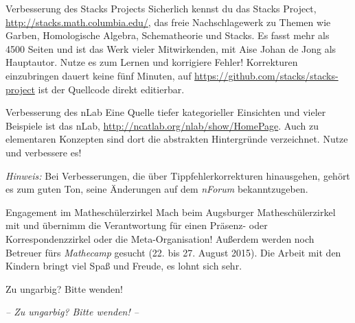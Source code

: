 \documentclass{uebblatt}
\begin{document}

\vspace{-0.5cm}
\begin{center}
  \setlength{\fboxsep}{0pt}
\end{center}
\vspace{0.3cm}

\begin{aufgabe}{Verbesserung des Stacks Projects}
Sicherlich kennst du das Stacks Project,
\url{http://stacks.math.columbia.edu/}, das freie Nachschlagewerk zu Themen wie
Garben, Homologische Algebra, Schematheorie und Stacks. Es fasst mehr als 4500
Seiten und ist das Werk vieler Mitwirkenden, mit Aise Johan de
Jong als Hauptautor. Nutze es zum Lernen und korrigiere Fehler! Korrekturen
einzubringen dauert keine fünf Minuten, auf
\url{https://github.com/stacks/stacks-project} ist der Quellcode direkt
editierbar.
\end{aufgabe}

\begin{aufgabe}{Verbesserung des nLab}
Eine Quelle tiefer kategorieller Einsichten und vieler Beispiele ist das nLab,
\url{http://ncatlab.org/nlab/show/HomePage}. Auch zu elementaren Konzepten sind
dort die abstrakten Hintergründe verzeichnet. Nutze und verbessere es!

{\tiny\emph{Hinweis:} Bei Verbesserungen, die über Tippfehlerkorrekturen
hinausgehen, gehört es zum guten Ton, seine Änderungen auf dem \emph{nForum}
bekanntzugeben.\par}
\end{aufgabe}

\begin{aufgabe}{Engagement im Matheschülerzirkel}
Mach beim Augsburger Matheschülerzirkel mit und übernimm die Verantwortung für
einen Präsenz- oder Korrespondenzzirkel oder die Meta-Organisation!
Außerdem werden noch Betreuer fürs \emph{Mathecamp} gesucht (22. bis 27. August
2015). Die Arbeit mit den Kindern bringt viel Spaß und Freude, es lohnt sich sehr.
\end{aufgabe}

\ifxetex
  \begin{center}Zu ungarbig? Bitte wenden!
  \end{center}
\else
  \begin{center}\emph{-- Zu ungarbig? Bitte wenden! --}
  \end{center}
\fi
\end{document}
